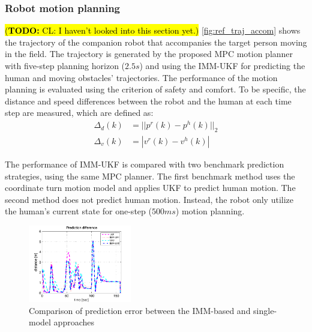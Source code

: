 \documentclass[journal]{IEEEtran}
\newcommand{\todohere}[1]{\hl{(\textbf{TODO:} #1)}}
\begin{document}
	\subsubsection{Robot motion planning}\label{subsubsec:motion_plan}
	\todohere{CL: I haven't looked into this section yet.}
	\cref{fig:ref_traj_accom} shows the trajectory of the companion robot that accompanies the target person moving in the field. The trajectory is generated by the proposed MPC motion planner with five-step planning horizon ($2.5s$) and using the IMM-UKF for predicting the human and moving obstacles' trajectories.
	The performance of the motion planning is evaluated using the criterion of safety and comfort.
	To be specific, the distance and speed differences between the robot and the human at each time step are measured, which are defined as:
	\begin{subequations}
		\begin{align}
		\Delta_d(k)&=||p^r(k)-p^h(k)||_2\label{eqn:err_d}\\
		\Delta_v(k)&=|v^r(k)-v^h(k)|\label{eqn:err_v}
		\end{align}
	\end{subequations}
	\normalsize
	
	The performance of IMM-UKF is compared with two benchmark prediction strategies, using the same MPC planner.
	The first benchmark method uses the coordinate turn motion model and applies UKF to predict human motion.
	The second method does not predict human motion.
	Instead, the robot only utilize the human's current state for one-step ($500ms$) motion planning.
	
	
	\begin{figure}
		\centering
		\includegraphics[width=0.4\textwidth]{figures/imm_vs_single}
		\caption{Comparison of prediction error between the IMM-based and single-model approaches}
		\label{fig:pred}
	\end{figure}
	
\end{document}
